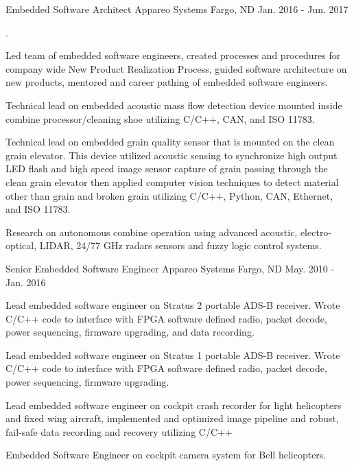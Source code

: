 \begin{cventries}
  \cventry
    {Embedded Software Architect} %
    {Appareo Systems} %
    {Fargo, ND} %
    {Jan. 2016 - Jun. 2017} %
    {.
      \begin{cvitems} %
        \item {Led team of embedded software engineers, created processes and procedures for company wide New Product Realization Process, guided software architecture on new products, mentored and career pathing of embedded software engineers.}
        \item {Technical lead on embedded acoustic mass flow detection device mounted inside combine processor/cleaning shoe utilizing C/C++, CAN, and ISO 11783.}
        \item {Technical lead on embedded grain quality sensor that is mounted on the clean grain elevator. This device utilized acoustic sensing to synchronize high output LED flash and high speed image sensor capture of grain passing through the clean grain elevator then applied computer vision techniques to detect material other than grain and broken grain utilizing C/C++, Python, CAN, Ethernet, and ISO 11783.}
        \item {Research on autonomous combine operation using advanced acoustic, electro-optical, LIDAR, 24/77 GHz radars sensors and fuzzy logic control systems.}
      \end{cvitems}
    }

  \cventry
    {Senior Embedded Software Engineer} %
    {Appareo Systems} %
    {Fargo, ND} %
    {May. 2010 - Jan. 2016} %
    {
      \begin{cvitems} %
        \item {Lead embedded software engineer on Stratus 2 portable ADS-B receiver. Wrote C/C++ code to interface with FPGA software defined radio, packet decode, power sequencing, firmware upgrading, and data recording.}
        \item {Lead embedded software engineer on Stratus 1 portable ADS-B receiver. Wrote C/C++ code to interface with FPGA software defined radio, packet decode, power sequencing, firmware upgrading.}
        \item {Lead embedded software engineer on cockpit crash recorder for light helicopters and fixed wing aircraft, implemented and optimized image pipeline and robust, fail-safe data recording and recovery utilizing C/C++}
        \item {Embedded Software Engineer on cockpit camera system for Bell helicopters.}
      \end{cvitems}
    }


\end{cventries}
